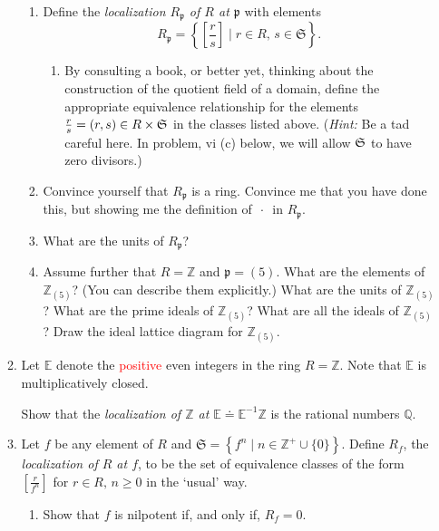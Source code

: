 \documentclass[11pt]{report}
\newcommand\ZZ{\mathbb Z}
\newcommand\QQ{\mathbb Q}
\newcommand\EE{\mathbb E}
\newcommand\Rp{R_{\mathfrak p}}
\newcommand\Rf{R_f}
\begin{document}
\begin{enumerate}
\begin{enumerate}
\begin{enumerate}
\item Define the \emph{localization $\Rp$ of $R$ at $\mathfrak{p}$} with elements
$$
\Rp = \left\{ \left[ \frac{r}{s} \right] \mid r \in R, \, s \in \mathfrak{S} \right\}.
$$

\begin{enumerate}

\item By consulting a book, or better yet, thinking about the construction of the
quotient field of a domain, define the appropriate equivalence relationship 
for the elements $\frac{r}{s} = (r,s) \in R \times \frak{S}$ in the classes listed above.
(\emph{Hint:} Be a tad careful here.  In problem, vi (c) below, we will allow $\frak S$
to have zero divisors.)
\end{enumerate}

\item Convince yourself that $\Rp$ is a ring.  Convince me that you have done
this, but showing me the definition of $\, \cdot \,$ in $\Rp$.

\item What are the units of $\Rp$?

\item Assume further that $R = \ZZ$ and $\mathfrak{p} = (5)$.  What
are the elements of $\ZZ_{(5)}$?  (You can describe them explicitly.)
What are the units of $\ZZ_{(5)}$?  
What are the prime ideals of $\ZZ_{(5)}$?  What are all
the ideals of $\ZZ_{(5)}$?  Draw the ideal lattice diagram for $\ZZ_{(5)}$.

\end{enumerate}

\item Let $\EE$ denote the \textcolor{red}{positive} even integers in the ring $R = \ZZ$.  Note
that $\EE$ is multiplicatively closed.

Show that the \emph{localization of $\ZZ$ at $\EE \doteq \EE^{-1} \ZZ$}
is the rational numbers $\QQ$.

\item Let $f$ be any element of $R$ and $\mathfrak{S} = \left\{ f^n \mid n \in \ZZ^+ \cup \{0\} \right\}$.
Define $\Rf$, the \emph{localization of $R$ at $f$}, to be the set of equivalence
classes of the form $\left[ \frac{r}{f^n} \right]$ for $r \in R, \, n \ge 0$ in the `usual' way.


\begin{enumerate}

\item Show that $f$ is nilpotent if, and only if, $\Rf = 0$.


\end{enumerate}
\end{enumerate}
\end{enumerate}
\end{document}
